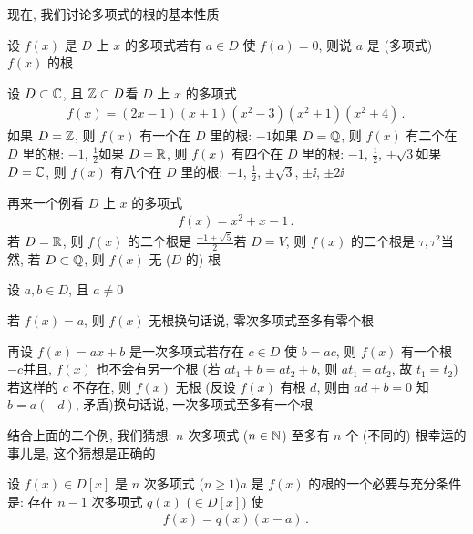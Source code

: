 现在, 我们讨论多项式的根的基本性质\period

\begin{definition}
    设 $f(x)$ 是 $D$ 上 $x$ 的多项式\period 若有 $a \in D$ 使 $f(a) = 0$, 则说 $a$ 是 (多项式) $f(x)$ 的根 \period
\end{definition}

\begin{example}
    设 $D \subset \mathbb{C}$, 且 $\mathbb{Z} \subset D$\period 看 $D$ 上 $x$ 的多项式
    \begin{align*}
        f(x) = (2x-1)(x+1)(x^2 - 3)(x^2 + 1)(x^2 + 4) \period
    \end{align*}
    如果 $D = \mathbb{Z}$, 则 $f(x)$ 有一个在 $D$ 里的根: $-1$\period 如果 $D = \mathbb{Q}$, 则 $f(x)$ 有二个在 $D$ 里的根: $-1$, $\frac12$\period 如果 $D = \mathbb{R}$, 则 $f(x)$ 有四个在 $D$ 里的根: $-1$, $\frac12$, $\pm \sqrt{3}$\period 如果 $D = \mathbb{C}$, 则 $f(x)$ 有八个在 $D$ 里的根: $-1$, $\frac12$, $\pm \sqrt{3}$, $\pm \ii$, $\pm 2\ii$\period
\end{example}

\begin{example}
    再来一个例\period 看 $D$ 上 $x$ 的多项式
    \begin{align*}
        f(x) = x^2 + x - 1 \period
    \end{align*}
    若 $D = \mathbb{R}$, 则 $f(x)$ 的二个根是 $\frac{-1 \pm \sqrt{5}}{2}$\period 若 $D = V$, 则 $f(x)$ 的二个根是 $\tau, \tau^2$\period 当然, 若 $D \subset \mathbb{Q}$, 则 $f(x)$ 无 ($D$ 的) 根\period
\end{example}

\begin{remark}
    设 $a,b \in D$, 且 $a \neq 0$\period

    若 $f(x) = a$, 则 $f(x)$ 无根\period 换句话说, 零次多项式至多有零个根\period

    再设 $f(x) = ax + b$ 是一次多项式\period 若存在 $c \in D$ 使 $b = ac$, 则 $f(x)$ 有一个根 $-c$\period 并且, $f(x)$ 也不会有另一个根 (若 $at_1 + b = at_2 + b$, 则 $at_1 = at_2$, 故 $t_1 = t_2$)\period 若这样的 $c$ 不存在, 则 $f(x)$ 无根 (反设 $f(x)$ 有根 $d$, 则由 $ad + b = 0$ 知 $b = a(-d)$, 矛盾)\period 换句话说, 一次多项式至多有一个根\period

    结合上面的二个例, 我们猜想: $n$ 次多项式 ($n \in \mathbb{N}$) 至多有 $n$ 个 (不同的) 根\period 幸运的事儿是, 这个猜想是正确的\period
\end{remark}

\begin{proposition}
    设 $f(x) \in D[x]$ 是 $n$ 次多项式 ($n \geq 1$)\period $a$ 是 $f(x)$ 的根的一个必要与充分条件是: 存在 $n-1$ 次多项式 $q(x)$ ($\in D[x]$) 使
    \begin{align*}
        f(x) = q(x) (x-a) \period
    \end{align*}
\end{proposition}


